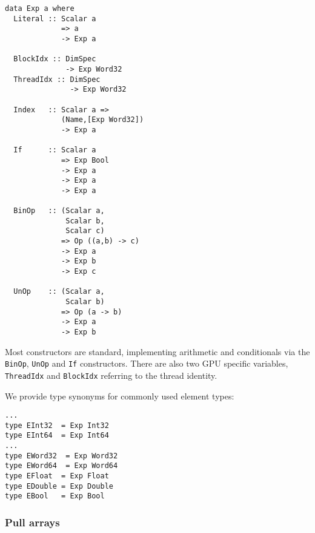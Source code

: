 \begin{small} 
\begin{Verbatim}[samepage=false]
data Exp a where
  Literal :: Scalar a 
             => a 
             -> Exp a 

  BlockIdx :: DimSpec 
              -> Exp Word32 
  ThreadIdx :: DimSpec
               -> Exp Word32
    
  Index   :: Scalar a => 
             (Name,[Exp Word32]) 
             -> Exp a 
             
  If      :: Scalar a 
             => Exp Bool
             -> Exp a 
             -> Exp a 
             -> Exp a 
                          
  BinOp   :: (Scalar a,
              Scalar b, 
              Scalar c) 
             => Op ((a,b) -> c) 
             -> Exp a 
             -> Exp b 
             -> Exp c 
             
  UnOp    :: (Scalar a, 
              Scalar b)
             => Op (a -> b)            
             -> Exp a 
             -> Exp b 
\end{Verbatim}
\end{small}
Most constructors are standard, implementing arithmetic and conditionals 
via the {\tt BinOp}, {\tt UnOp} and {\tt If} constructors. There are also two 
GPU specific variables, {\tt ThreadIdx} and {\tt BlockIdx} referring to the thread 
identity. 

We provide type synonyms for commonly used element types: 
\begin{small} 
\begin{Verbatim}[samepage=true]
...
type EInt32  = Exp Int32
type EInt64  = Exp Int64
...
type EWord32  = Exp Word32 
type EWord64  = Exp Word64 
type EFloat  = Exp Float  
type EDouble = Exp Double 
type EBool   = Exp Bool 
\end{Verbatim}
\end{small}   

\subsubsection{Pull arrays}


